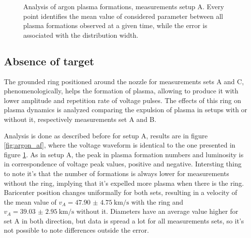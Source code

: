 \begin{figure}
 \hfill
 \caption{Analysis of argon plasma formations, measurements setup A. Every point identifies the mean value of considered parameter between all plasma formations observed at a given time, while the error is associated with the distribution width.}
 \label{fig:argon_b}
\end{figure}


\subsection{Absence of target}
The grounded ring positioned around the nozzle for measurements sets A and C, phenomenologically, helps the formation of plasma, allowing to produce it with lower amplitude and repetition rate of voltage pulses. The effects of this ring on plasma dynamics is analyzed comparing the expulsion of plasma in setups with or without it, respectively measurements set A and B.

Analysis is done as described before for setup A, results are in figure \ref{fig:argon_af}, where the voltage waveform is identical to the one presented in figure \ref{fig:argon_b}.
As in setup A, the peak in plasma formation numbers and luminosity is in correspondence of voltage peak values, positive and negative. Intersting thing to note it's that the number of formations is always lower for measurements without the ring, implying that it's expelled more plasma when there is the ring.
Baricenter position changes uniformally for both sets, resulting in a velocity of the mean value of $v_A = \SI{47.90(475)}{\kilo\meter/\second}$ with the ring and $v_A = \SI{39.03(295)}{\kilo\meter/\second}$ without it.
Diameters have an average value higher for set A in both direction, but data is spread a lot for all measurements sets, so it's not possible to note differences outside the error.

